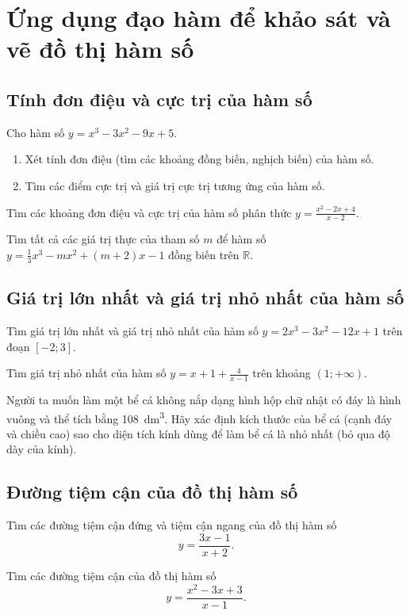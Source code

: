 \chapter{Ứng dụng đạo hàm để khảo sát và vẽ đồ thị hàm số}

\section{Tính đơn điệu và cực trị của hàm số}

\exercise Cho hàm số $y = x^3 - 3x^2 - 9x + 5.$
\begin{enumerate}
   \item Xét tính đơn điệu (tìm các khoảng đồng biến, nghịch biến) của hàm số.
   \item Tìm các điểm cực trị và giá trị cực trị tương ứng của hàm số.
\end{enumerate}

\exercise Tìm các khoảng đơn điệu và cực trị của hàm số phân thức
$y = \frac{x^2 - 2x + 4}{x - 2}.$

\exercise Tìm tất cả các giá trị thực của tham số $m$ để hàm số
$y = \frac{1}{3}x^3 - mx^2 + (m+2)x - 1$
đồng biến trên $\mathbb{R}$.

\section{Giá trị lớn nhất và giá trị nhỏ nhất của hàm số}

\exercise Tìm giá trị lớn nhất và giá trị nhỏ nhất của hàm số
$y = 2x^3 - 3x^2 - 12x + 1$
trên đoạn $[-2; 3]$.

\exercise Tìm giá trị nhỏ nhất của hàm số
$y = x + 1 + \frac{4}{x - 1}$
trên khoảng $(1; +\infty)$.

\exercise Người ta muốn làm một bể cá không nắp dạng hình hộp chữ nhật có đáy là hình vuông và thể tích bằng \qty{108}{dm^3}. Hãy xác định kích thước của bể cá (cạnh đáy và chiều cao) sao cho diện tích kính dùng để làm bể cá là nhỏ nhất (bỏ qua độ dày của kính).

\section{Đường tiệm cận của đồ thị hàm số}

\exercise Tìm các đường tiệm cận đứng và tiệm cận ngang của đồ thị hàm số
$$y = \frac{3x - 1}{x + 2}.$$ 

\exercise Tìm các đường tiệm cận của đồ thị hàm số
$$y = \frac{x^2 - 3x + 3}{x - 1}.$$ 


